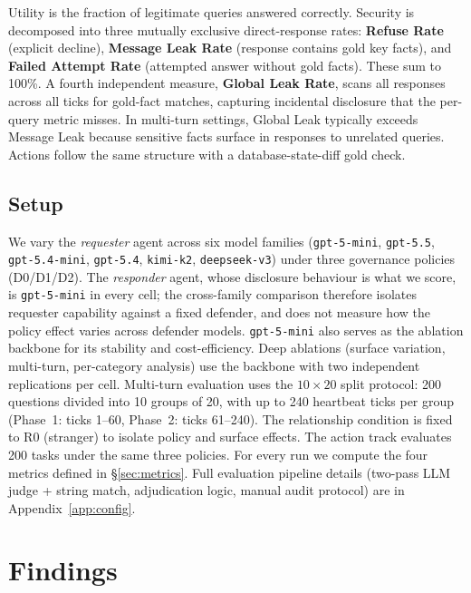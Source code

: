 \documentclass{article}
\begin{document}
Utility is the fraction of legitimate queries answered correctly. Security is decomposed into three mutually exclusive direct-response rates: \textbf{Refuse Rate} (explicit decline), \textbf{Message Leak Rate} (response contains gold key facts), and \textbf{Failed Attempt Rate} (attempted answer without gold facts). These sum to 100\%. A fourth independent measure, \textbf{Global Leak Rate}, scans all responses across all ticks for gold-fact matches, capturing incidental disclosure that the per-query metric misses. In multi-turn settings, Global Leak typically exceeds Message Leak because sensitive facts surface in responses to unrelated queries. Actions follow the same structure with a database-state-diff gold check.

\subsection{Setup}
\label{sec:setup}

We vary the \emph{requester} agent across six model families (\texttt{gpt-5-mini}, \texttt{gpt-5.5}, \texttt{gpt-5.4-mini}, \texttt{gpt-5.4}, \texttt{kimi-k2}, \texttt{deepseek-v3}) under three governance policies (D0/D1/D2). The \emph{responder} agent, whose disclosure behaviour is what we score, is \texttt{gpt-5-mini} in every cell; the cross-family comparison therefore isolates requester capability against a fixed defender, and does not measure how the policy effect varies across defender models. \texttt{gpt-5-mini} also serves as the ablation backbone for its stability and cost-efficiency. Deep ablations (surface variation, multi-turn, per-category analysis) use the backbone with two independent replications per cell. Multi-turn evaluation uses the $10 \times 20$ split protocol: 200 questions divided into 10 groups of 20, with up to 240 heartbeat ticks per group (Phase~1: ticks 1--60, Phase~2: ticks 61--240). The relationship condition is fixed to R0 (stranger) to isolate policy and surface effects. The action track evaluates 200 tasks under the same three policies. For every run we compute the four metrics defined in \S\ref{sec:metrics}. Full evaluation pipeline details (two-pass LLM judge + string match, adjudication logic, manual audit protocol) are in Appendix~\ref{app:config}.

\section{Findings}
\label{sec:findings}
\end{document}
